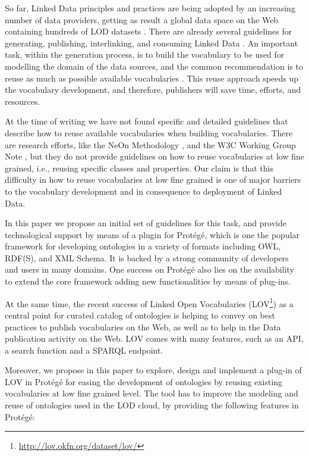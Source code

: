 So far, Linked Data principles and practices are being adopted by an increasing number of data providers, getting as result a global data space on the Web containing hundreds of LOD datasets \cite{Heath_Bizer_2011}. There are already several guidelines for generating, publishing, interlinking, and consuming Linked Data \cite{}. An important task, within the generation process, is to build the vocabulary to be used for modelling the domain of the data sources, and the common recommendation is to reuse as much as possible available vocabularies \cite{}. This reuse approach speeds up the vocabulary development, and therefore, publishers will save time, efforts, and resources. 

At the time of writing we have not found specific and detailed guidelines that describe how to reuse available vocabularies when building vocabularies. There are research efforts, like the NeOn Methodology \cite{}, and the W3C Working Group Note \cite{}, but they do not provide guidelines on how to reuse vocabularies at low fine grained, i.e., reusing specific classes and properties. Our claim is that this difficulty in how to reuse vocabularies at low fine grained is one of major barriers to the vocabulary development and in consequence to deployment of Linked Data.

In this paper we propose an initial set of guidelines for this task, and provide technological support by means of a plugin for Prot{\'e}g{\'e}, which is one the popular framework for developing ontologies in a variety of formats including OWL, RDF(S), and XML Schema. It is backed by a strong community of developers and users in many domains. One success on Prot{\'e}g{\'e} also lies on the availability to extend the core framework adding new functionalities by means of plug-ins.

At the same time, the recent success of Linked Open Vocabularies (LOV\footnote{\url{http://lov.okfn.org/dataset/lov/}}) as a central point for curated catalog of ontologies is helping to convey on best practices to publish vocabularies on the Web, as well as to help in the Data publication activity on the Web. LOV comes with many features, such as an API, a search function and a SPARQL endpoint.
 
Moreover, we propose in this paper to explore, design and implement a plug-in of LOV in Prot{\'e}g{\'e} for easing the development of ontologies by reusing existing vocabularies at low fine grained level. The tool has to improve the modeling and reuse of ontologies used in the LOD cloud, by providing the following features in Prot{\'e}g{\'e}:

